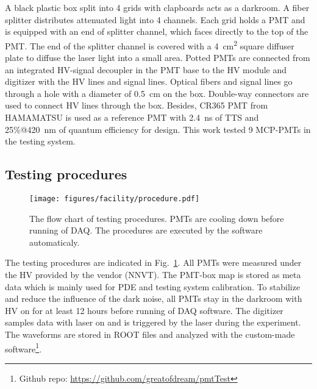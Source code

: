 A black plastic box split into 4 grids with clapboards acts as a darkroom. A fiber splitter %
distributes attenuated light into 4 channels. Each grid holds a PMT and is equipped with an end of splitter channel, which faces directly to the top of the PMT. The end of the splitter channel is covered with a \SI{4}{cm\tothe{2}} square diffuser plate to diffuse the laser light into a small area. Potted PMTs are connected from an integrated HV-signal decoupler in the PMT base to the HV module and digitizer with the HV lines and signal lines. Optical fibers and signal lines go through a hole with a diameter of \SI{0.5}{cm} on the box. Double-way connectors are used to connect HV lines through the box. Besides, CR365 PMT \cite{BJBS} from HAMAMATSU is used as a reference PMT with \SI{2.4}{ns} of TTS and 25\%@\SI{420}{nm} of quantum efficiency for design. %
This work tested 9 MCP-PMTs in the testing system.

\subsection{Testing procedures}
\begin{figure}
    \centering
    \texttt{[image: figures/facility/procedure.pdf]}
    \caption{The flow chart of testing procedures. PMTs are cooling down before running of DAQ. The procedures are executed by the software automaticaly.}
    \label{fig:testingprocedure}
\end{figure}

The testing procedures are indicated in Fig.~\ref{fig:testingprocedure}. All PMTs were measured under the HV provided by the vendor (NNVT). %
The PMT-box map is stored as meta data which is mainly used for PDE and testing system calibration. To stabilize and reduce the influence of the dark noise, all PMTs stay in the darkroom with HV on for at least 12 hours before running of DAQ software. %
The digitizer samples data with laser on and is triggered by the laser during the experiment. The waveforms are stored in ROOT files and analyzed with the custom-made software\footnote{Github repo: \url{https://github.com/greatofdream/pmtTest}}.
